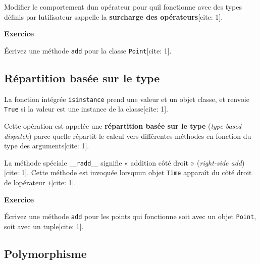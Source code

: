 \begin{Shaded}
\begin{Highlighting}[]

 \NormalTok{(}
\OperatorTok{=} \OperatorTok{+}
\end{Highlighting}
\end{Shaded}

Modifier le comportement d\textquotesingle un opérateur pour
qu\textquotesingle il fonctionne avec des types définis par
l\textquotesingle utilisateur s\textquotesingle appelle la
\textbf{surcharge des opérateurs}{[}cite: 1{]}.

\textbf{Exercice}

Écrivez une méthode \texttt{add} pour la classe \texttt{Point}{[}cite:
1{]}.

\hypertarget{ruxe9partition-basuxe9e-sur-le-type}{%
\subsection{Répartition basée sur le
type}\label{ruxe9partition-basuxe9e-sur-le-type}}

La fonction intégrée \texttt{isinstance} prend une valeur et un objet
classe, et renvoie \texttt{True} si la valeur est une instance de la
classe{[}cite: 1{]}.

Cette opération est appelée une \textbf{répartition basée sur le type}
(\emph{type-based dispatch}) parce qu\textquotesingle elle répartit le
calcul vers différentes méthodes en fonction du type des
arguments{[}cite: 1{]}.

La méthode spéciale \texttt{\_\_radd\_\_} signifie « addition côté droit
» (\emph{right-side add}){[}cite: 1{]}. Cette méthode est invoquée
lorsqu\textquotesingle un objet \texttt{Time} apparaît du côté droit de
l\textquotesingle opérateur \texttt{+}{[}cite: 1{]}.

\textbf{Exercice}

Écrivez une méthode \texttt{add} pour les points qui fonctionne soit
avec un objet \texttt{Point}, soit avec un tuple{[}cite: 1{]}.

\hypertarget{polymorphisme}{%
\subsection{Polymorphisme}\label{polymorphisme}}


